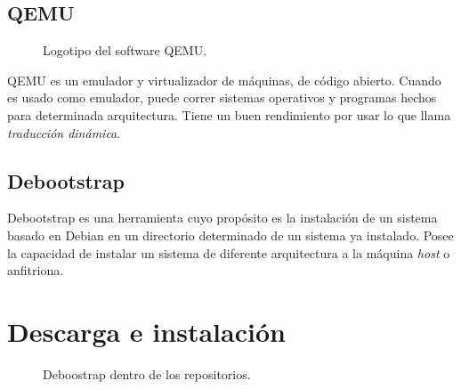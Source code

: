 \subsection{QEMU}

\begin{figure}[H] %
\caption{Logotipo del software QEMU.}
\label{fig:LogoQ}
\end{figure}

QEMU es un emulador y virtualizador de máquinas, de código abierto. Cuando es usado como emulador, puede correr sistemas operativos y programas  hechos para determinada arquitectura. Tiene un buen rendimiento por usar lo que llama \textit{traducción dinámica}.

\subsection{Debootstrap}
Debootstrap es una herramienta cuyo propósito es la instalación de un sistema basado en Debian en un directorio determinado de un sistema ya instalado. Posee la capacidad de instalar un sistema de diferente arquitectura a la máquina \textit{host} o anfitriona.

\section{Descarga e instalación}\label{sec:install} %

\begin{figure}[H] %
\caption{Deboostrap dentro de los repositorios.}
\label{fig:DBSRep}
\end{figure}

